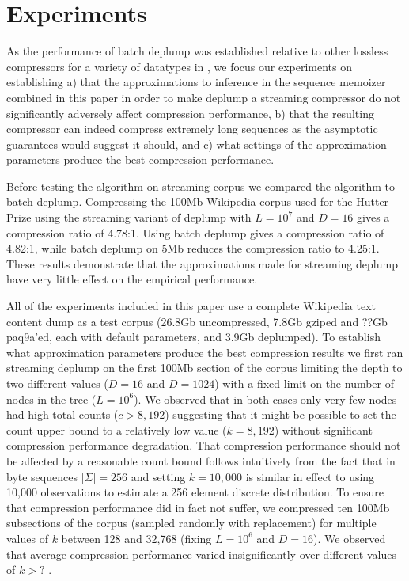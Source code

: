 \section{Experiments}
\label{sec:experiments}

As the performance of batch deplump was established relative to other lossless compressors for a variety of datatypes in \citep{Gasthaus2010}, we focus our experiments on establishing a) that the approximations to inference in the sequence memoizer combined in this paper in order to make deplump a streaming compressor do not significantly adversely affect compression performance, b) that the resulting compressor can indeed compress extremely long sequences as the asymptotic guarantees would suggest it should, and c) what settings of the approximation parameters produce the best compression performance.

Before testing the algorithm on streaming corpus we compared the algorithm to batch deplump.  Compressing the 100Mb Wikipedia corpus used for the Hutter Prize \cite{hutterprize} using the streaming variant of deplump with $L = 10^{7}$ and $D = 16$ gives a compression ratio of 4.78:1.  Using batch deplump gives a compression ratio of 4.82:1, while batch deplump on 5Mb reduces the compression ratio to 4.25:1.  These results demonstrate that the approximations made for streaming deplump have very little effect on the empirical performance.

All of the experiments included in this paper use a complete Wikipedia text content dump \citep{Wikipedia} as a test corpus (26.8Gb uncompressed, 7.8Gb gziped and ??Gb paq9a'ed, each with default parameters, and 3.9Gb deplumped).  To establish what approximation parameters produce the best compression results we first ran streaming deplump on the first 100Mb section of the corpus limiting the depth to two different values ($D=16$ and $D=1024$) with a fixed limit on the number of nodes in the tree ($L=10^6$).  We observed that in both cases only very few nodes had high total counts ($c > 8,192$) suggesting that it might be possible to set the count upper bound to a relatively low value ($k= 8,192$) without significant compression performance degradation.  That compression performance should not be affected by a reasonable count bound follows intuitively from the fact that in byte sequences $|\Sigma| = 256$ and setting $k=10,000$ is similar in effect to using 10,000 observations to estimate a 256 element discrete distribution.  To ensure that compression performance did in fact not suffer, we compressed ten 100Mb subsections of the corpus (sampled randomly with replacement) for multiple values of $k$ between 128 and 32,768 (fixing $L=10^6$ and $D=16$).  We observed that average compression performance varied insignificantly over different values of $k>?$ .

